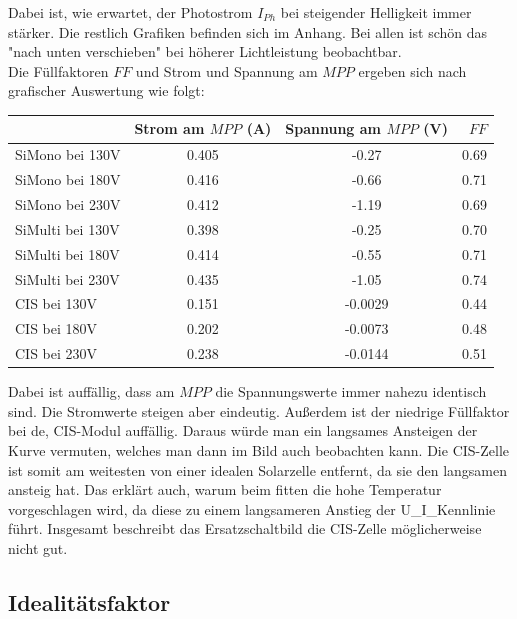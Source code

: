 Dabei ist, wie erwartet, der Photostrom $I_{Ph}$ bei steigender Helligkeit immer stärker. Die restlich Grafiken befinden sich im Anhang. Bei 
allen ist schön das "nach unten verschieben" bei höherer Lichtleistung beobachtbar. \\
Die Füllfaktoren $FF$ und Strom und Spannung am $MPP$ ergeben sich nach grafischer Auswertung wie folgt:\\
\begin{table}[h]
    \centering
    \begin{tabular}{l|c|c|r}
        & Strom am $MPP$ (A) & Spannung am $MPP$ (V) & $FF$ \\
        \toprule
        SiMono bei 130V & 0.405 & -0.27 & 0.69 \\
        SiMono bei 180V & 0.416 &-0.66 & 0.71 \\
        SiMono bei 230V & 0.412 & -1.19 & 0.69\\
        \midrule
        SiMulti bei 130V & 0.398 & -0.25 & 0.70 \\
        SiMulti bei 180V & 0.414 & -0.55 & 0.71 \\
        SiMulti bei 230V & 0.435 & -1.05 & 0.74\\
        \midrule
        CIS bei 130V & 0.151 &  -0.0029 & 0.44 \\
        CIS bei 180V & 0.202 & -0.0073 & 0.48 \\
        CIS bei 230V & 0.238 & -0.0144 & 0.51\\
    \end{tabular}
\end{table}

Dabei ist auffällig, dass am $MPP$ die Spannungswerte immer nahezu identisch sind. Die Stromwerte steigen aber eindeutig. Außerdem ist der 
niedrige Füllfaktor bei de, CIS-Modul auffällig. Daraus würde man ein langsames Ansteigen der Kurve vermuten, welches man dann im Bild auch beobachten kann. 
Die CIS-Zelle ist somit am weitesten von einer idealen Solarzelle entfernt, da sie den langsamen ansteig hat. Das erklärt auch, warum beim fitten die 
hohe Temperatur vorgeschlagen wird, da diese zu einem langsameren Anstieg der U_I_Kennlinie führt. Insgesamt beschreibt das Ersatzschaltbild 
die CIS-Zelle möglicherweise nicht gut.

\subsection{Idealitätsfaktor}